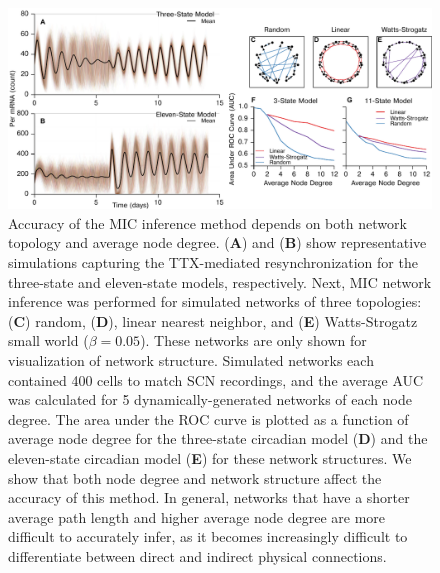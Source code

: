 \begin{figure}[p]
    \begin{center}
        \includegraphics[width=6.5in]{chap3/figures/s7.pdf}
    \end{center}
    \caption{\label{fig:s7}
    Accuracy of the MIC inference method depends on both network topology and average node degree. 
    (\textbf{A}) and (\textbf{B}) show representative simulations capturing the TTX-mediated resynchronization for the three-state and eleven-state models, respectively.
    Next, MIC network inference was performed for simulated networks of three topologies: (\textbf{C}) random, (\textbf{D}), linear nearest neighbor, and (\textbf{E}) Watts-Strogatz small world ($\beta=0.05$).
    These networks are only shown for visualization of network structure.
    Simulated networks each contained 400 cells to match SCN recordings, and the average AUC was calculated for 5 dynamically-generated networks of each node degree.
    The area under the ROC curve is plotted as a function of average node degree for the three-state circadian model \cite{Gonze2006,Schroder2012} (\textbf{D}) and the eleven-state circadian model \cite{Abel2015a} (\textbf{E}) for these network structures.
    We show that both node degree and network structure affect the accuracy of this method.
    In general, networks that have a shorter average path length and higher average node degree are more difficult to accurately infer, as it becomes increasingly difficult to differentiate between direct and indirect physical connections.
}
\end{figure}


